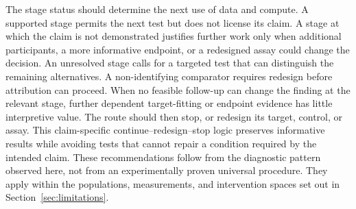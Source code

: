 The stage status should determine the next use of data and compute.
A supported stage permits the next test but does not license its claim.
A stage at which the claim is not demonstrated justifies further work only when additional participants, a more informative endpoint, or a redesigned assay could change the decision.
An unresolved stage calls for a targeted test that can distinguish the remaining alternatives.
A non-identifying comparator requires redesign before attribution can proceed.
When no feasible follow-up can change the finding at the relevant stage, further dependent target-fitting or endpoint evidence has little interpretive value.
The route should then stop, or redesign its target, control, or assay.
This claim-specific continue--redesign--stop logic preserves informative results while avoiding tests that cannot repair a condition required by the intended claim.
These recommendations follow from the diagnostic pattern observed here, not from an experimentally proven universal procedure.
They apply within the populations, measurements, and intervention spaces set out in Section~\ref{sec:limitations}.
